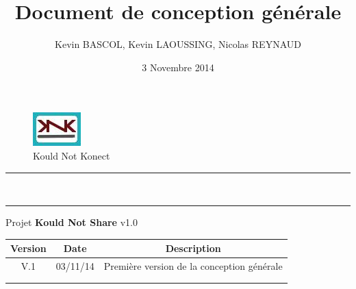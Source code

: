 \documentclass[10pt,a4paper]{report}
\author{Kevin BASCOL, Kevin LAOUSSING, Nicolas REYNAUD}
\title{Document de conception générale}
\date{3 Novembre 2014}
\begin{document}
\makeatletter
	\begin{titlepage}
	
	\begin{figure}
		\begin{minipage}[c]{.46\linewidth}
		\end{minipage} \hfill
		\begin{minipage}[c]{.20\linewidth}
			\begin{center}
				\includegraphics{../Logo/logoKNK.jpg}\\
				{\large Kould Not Konect}
			\end{center}
		\end{minipage}
	\vspace{1cm}
	\end{figure}
	
	\centering
		{
		\hrule height 2pt
		\vspace{0.7cm}
		\Huge \textbf{\@title}}\\
		\vspace{0.7cm}
		\hrule height 2pt
		\vspace{1.5cm}
		{\LARGE  Projet \textbf{Kould Not Share} v1.0}
		
		\vfill
		
		\begin{tabular}{|c|c|c|}
			\hline
			Version & Date & Description\\
			\hline
			V.1 & 03/11/14 & Première version de la conception générale\\
			\hline
			 & & \\
			\hline
			 & & \\
			\hline
		\end{tabular}\\
		\vspace{1cm}
		\@author\\
		\end{titlepage}
\makeatother
\setcounter{secnumdepth}{5}
\setcounter{tocdepth}{5}
\renewcommand{\contentsname}{Sommaire}
\begingroup\makeatletter
\def\@makeschapterhead#1{%
  {\parindent \z@ \raggedright
    \normalfont
    \interlinepenalty\@M
    \Huge \bfseries  #1\par\nobreak
    \vskip 20pt%
  }}\makeatother
\tableofcontents
\endgroup
\thispagestyle{empty}
\setcounter{page}{0}
\newpage
\end{document}
